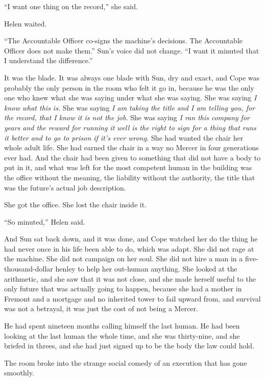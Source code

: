 \documentclass[11pt,openany]{book}
\newcommand{\scenebreak}{\par\vspace{0.5\baselineskip}\begin{center}\textasteriskcentered\quad\textasteriskcentered\quad\textasteriskcentered\end{center}\vspace{0.5\baselineskip}\par}
\begin{document}
``I want one thing on the record,'' she said.

Helen waited.

``The Accountable Officer co-signs the machine's decisions. The Accountable Officer does not make them.'' Sun's voice did not change. ``I want it minuted that I understand the difference.''

It was the blade. It was always one blade with Sun, dry and exact, and Cope was probably the only person in the room who felt it go in, because he was the only one who knew what she was saying under what she was saying. She was saying \textit{I know what this is.} She was saying \textit{I am taking the title and I am telling you, for the record, that I know it is not the job.} She was saying \textit{I ran this company for years and the reward for running it well is the right to sign for a thing that runs it better and to go to prison if it's ever wrong.} She had wanted the chair her whole adult life. She had earned the chair in a way no Mercer in four generations ever had. And the chair had been given to something that did not have a body to put in it, and what was left for the most competent human in the building was the office without the meaning, the liability without the authority, the title that was the future's actual job description.

She got the office. She lost the chair inside it.

``So minuted,'' Helen said.

And Sun sat back down, and it was done, and Cope watched her do the thing he had never once in his life been able to do, which was adapt. She did not rage at the machine. She did not campaign on her soul. She did not hire a man in a five-thousand-dollar henley to help her out-human anything. She looked at the arithmetic, and she saw that it was not close, and she made herself useful to the only future that was actually going to happen, because she had a mother in Fremont and a mortgage and no inherited tower to fail upward from, and survival was not a betrayal, it was just the cost of not being a Mercer.

He had spent nineteen months calling himself the last human. He had been looking at the last human the whole time, and she was thirty-nine, and she briefed in threes, and she had just signed up to be the body the law could hold.


\scenebreak


The room broke into the strange social comedy of an execution that has gone smoothly.
\end{document}
